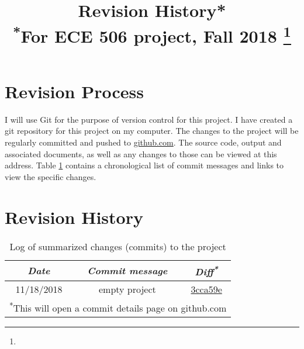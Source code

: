 \documentclass[conference]{IEEEtran}
\begin{document}
\title{Revision History*\\
{\footnotesize \textsuperscript{*}For ECE 506 project, Fall 2018}
\thanks{}
}

\author{
}

\onecolumn

\maketitle

\section{Revision Process}
I will use Git for the purpose of version control for this project. I have created a git repository for this project on my computer. The changes to the project will be regularly committed and pushed to \href{https://github.com/esalman/optimization_project/}{github.com}. The source code, output and associated documents, as well as any changes to those can be viewed at this address. Table \ref{tab1} contains a chronological list of commit messages and links to view the specific changes.

\section{Revision History}

\begin{table}[htbp]
\caption{Log of summarized changes (commits) to the project}
\begin{center}
\begin{tabular}{|c|c|c|}
\hline
\textbf{\textit{Date}} & \textbf{\textit{Commit message}} & \textbf{\textit{Diff\textsuperscript{*}}} \\
\hline
11/18/2018 & empty project & \href{https://github.com/esalman/optimization_project/commit/3cca59ef96b87e23606e25f05718cc9657fb858e}{3cca59e} \\
\hline
\multicolumn{3}{l}{\textsuperscript{*}This will open a commit details page on github.com}
\end{tabular}
\label{tab1}
\end{center}
\end{table}
\end{document}

